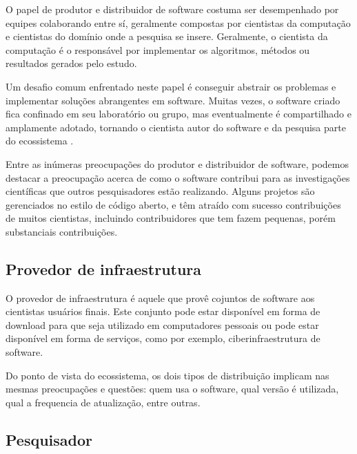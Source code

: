 O papel de produtor e distribuidor de software costuma ser desempenhado por
equipes colaborando entre sí, geralmente compostas por cientistas 
da computação e cientistas do domínio onde a pesquisa se insere. Geralmente, 
o cientista da computação é o responsável por implementar os algoritmos, 
métodos ou resultados gerados pelo estudo.

Um desafio comum enfrentado neste papel é conseguir abstrair os problemas e
implementar soluções abrangentes em software. Muitas vezes, o software criado
fica confinado em seu laboratório ou grupo, mas eventualmente é compartilhado e
amplamente adotado, tornando o cientista autor do software e da
pesquisa parte do ecossistema \cite{howison2015understanding}.


Entre as inúmeras preocupações do produtor e distribuidor de software, 
podemos destacar a preocupação acerca de como o software contribui para 
as investigações científicas que outros pesquisadores
estão realizando.
Alguns projetos são gerenciados no estilo de código aberto, e
têm atraído com sucesso contribuições de muitos cientistas, incluindo 
contribuidores que tem fazem pequenas, porém  substanciais contribuições.


\subsection{Provedor de infraestrutura}

O provedor de infraestrutura é aquele que provê cojuntos de software aos
cientistas usuários finais. Este conjunto pode estar disponível em forma de
download para que seja utilizado em computadores pessoais ou pode estar
disponível em forma de serviços, como por exemplo, ciberinfraestrutura de
software.

Do ponto de vista do ecossistema, os dois tipos de distribuição implicam nas
mesmas preocupações e questões: quem usa o software, qual versão é utilizada, 
qual a frequencia de atualização, entre outras.

\subsection{Pesquisador}


